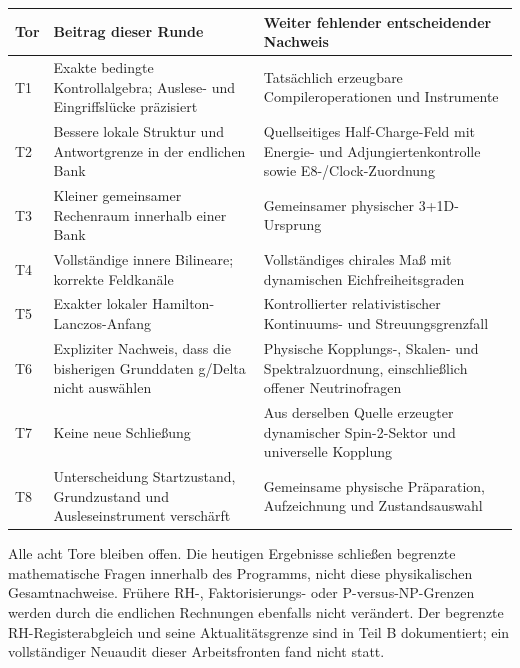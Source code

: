{\def\LTcaptype{none} %
\begin{longtable}[]{@{}
  >{\raggedright\arraybackslash}p{}
  >{\raggedright\arraybackslash}p{}
  >{\raggedright\arraybackslash}p{}@{}}
\toprule\noalign{}
\begin{minipage}[b]{\linewidth}\raggedright
Tor
\end{minipage} & \begin{minipage}[b]{\linewidth}\raggedright
Beitrag dieser Runde
\end{minipage} & \begin{minipage}[b]{\linewidth}\raggedright
Weiter fehlender entscheidender Nachweis
\end{minipage} \\
\midrule\noalign{}
\endhead
\bottomrule\noalign{}
\endlastfoot
T1 & Exakte bedingte Kontrollalgebra; Auslese- und Eingriffslücke
präzisiert & Tatsächlich erzeugbare Compileroperationen und
Instrumente \\
T2 & Bessere lokale Struktur und Antwortgrenze in der endlichen Bank &
Quellseitiges Half-Charge-Feld mit Energie- und Adjungiertenkontrolle
sowie E8-/Clock-Zuordnung \\
T3 & Kleiner gemeinsamer Rechenraum innerhalb einer Bank & Gemeinsamer
physischer 3+1D-Ursprung \\
T4 & Vollständige innere Bilineare; korrekte Feldkanäle & Vollständiges
chirales Maß mit dynamischen Eichfreiheitsgraden \\
T5 & Exakter lokaler Hamilton-Lanczos-Anfang & Kontrollierter
relativistischer Kontinuums- und Streuungsgrenzfall \\
T6 & Expliziter Nachweis, dass die bisherigen Grunddaten g/Delta nicht
auswählen & Physische Kopplungs-, Skalen- und Spektralzuordnung,
einschließlich offener Neutrinofragen \\
T7 & Keine neue Schließung & Aus derselben Quelle erzeugter dynamischer
Spin-2-Sektor und universelle Kopplung \\
T8 & Unterscheidung Startzustand, Grundzustand und Ausleseinstrument
verschärft & Gemeinsame physische Präparation, Aufzeichnung und
Zustandsauswahl \\
\end{longtable}
}

Alle acht Tore bleiben offen. Die heutigen Ergebnisse schließen
begrenzte mathematische Fragen innerhalb des Programms, nicht diese
physikalischen Gesamtnachweise. Frühere RH-, Faktorisierungs- oder
P-versus-NP-Grenzen werden durch die endlichen Rechnungen ebenfalls
nicht verändert. Der begrenzte RH-Registerabgleich und seine
Aktualitätsgrenze sind in Teil B dokumentiert; ein vollständiger
Neuaudit dieser Arbeitsfronten fand nicht statt.

